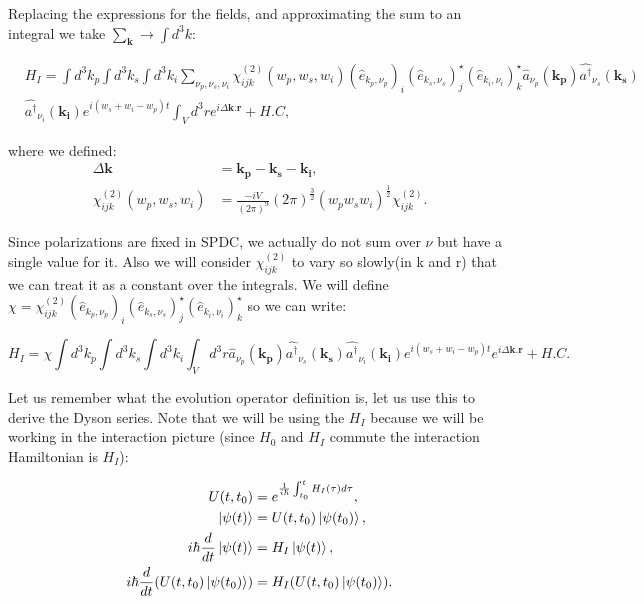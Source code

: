 \documentclass[12pt]{book}
\begin{document}
Replacing the expressions for the fields, and approximating the sum to an integral we take $\sum_{\textbf{k}}\xrightarrow{}\int d^{3}k$:

\begin{align*}
&H_{I}=\int d^{3}k_{p}\int d^{3}k_{s}\int d^{3}k_{i} \sum_{\nu_{p},\nu_{s},\nu_{i}}\chi_{ijk}^{(2)}(w_{p},w_{s},w_{i}) (\hat{e}_{k_{p},\nu_{p}})_{i} (\hat{e}_{k_{s},\nu_{s}})^{\star}_{j} (\hat{e}_{k_{i},\nu_{i}})^{\star}_{k} \hat{a}_{\nu_{p}}(\mathbf{k_{p}})\hat{a^{\dagger}}_{\nu_{s}}(\mathbf{k_{s}})\\
&\hat {a^{\dagger}}_{\nu_{i}}(\mathbf{k_{i}})e^{i(w_{s}+w_{i}-w_{p})t} \int_{V}d^{3}r e^{i \Delta\textbf{k}.\textbf{r}}+H.C ,
\end{align*}

where we defined:
\begin{align}
\Delta \textbf{k}&= \mathbf{k_{p}}-\mathbf{k_{s}}-\mathbf{k_{i}},\\
\chi_{ijk}^{(2)}(w_{p},w_{s},w_{i})&=\frac{-iV}{(2\pi)^9}(2 \pi)^{\frac{3}{2}} (w_{p}w_{s}w_{i})^{\frac{1}{2}}\chi_{ijk}^{(2)}.
\end{align}

Since polarizations are fixed in SPDC, we actually do not sum over $\nu$ but have a single value for it. Also we will consider $\chi_{ijk}^{(2)}$ to vary so slowly(in k and r) that we can treat it as a constant over the integrals. We will define $\chi=\chi_{ijk}^{(2)} (\hat{e}_{k_{p},\nu_{p}})_{i} (\hat{e}_{k_{s},\nu_{s}})^{\star}_{j} (\hat{e}_{k_{i},\nu_{i}})^{\star}_{k}$ so we can write:

\begin{equation}
H_{I}=\chi \int d^{3}k_{p}\int d^{3}k_{s}\int d^{3}k_{i}\int_{V} d^{3}r \hat{a}_{\nu_{p}}(\mathbf{k_{p}})\hat{a^{\dagger}}_{\nu_{s}}(\mathbf{k_{s}})\hat {a^{\dagger}}_{\nu_{i}}(\mathbf{k_{i}})e^{i(w_{s}+w_{i}-w_{p})t}e^{i \Delta\textbf{k}.\textbf{r}}+H.C.
\end{equation}


Let us remember what the evolution operator definition is, let us use this to derive the Dyson series. Note that we will be using the $H_{I}$ because we will be working in the interaction picture (since $H_{0}$ and $H_{I}$ commute the interaction Hamiltonian is $H_{I}$):


\begin{align}
U(t,t_{0})&=e^{\frac{1}{i \hbar} \int_{t_{0}}^{t} H_{I}(\tau) d\tau},\\
\ket{\psi(t)}&=U(t,t_{0})\ket{\psi(t_{0})},\\
i \hbar \frac{d}{dt}\ket{\psi(t)}&=H_{I}\ket{\psi(t)},\\
i \hbar \frac{d}{dt}(U(t,t_{0})\ket{\psi(t_{0})})&=H_{I}(U(t,t_{0})\ket{\psi(t_{0})}). 
\end{align}
\end{document}
